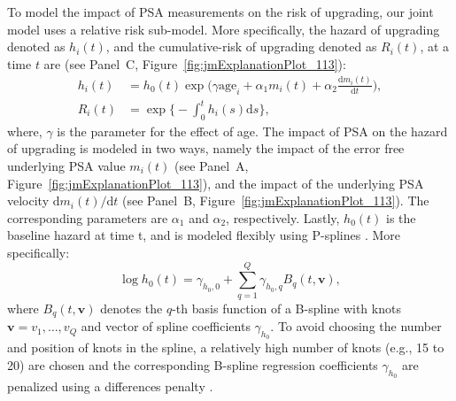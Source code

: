To model the impact of PSA measurements on the risk of upgrading, our joint model uses a relative risk sub-model. More specifically, the hazard of upgrading denoted as $h_i(t)$, and the cumulative-risk of upgrading denoted as $R_i(t)$, at a time $t$ are (see Panel~C, Figure~\ref{fig:jmExplanationPlot_113}):
\begin{equation}
\label{eq:rel_risk_model}
\begin{split}
    h_i(t) &= h_0(t) \exp\Big(\gamma \mbox{age}_i +\alpha_{1} m_{i}(t) + \alpha_{2} \frac{\mathrm{d}m_{i}(t)}{\mathrm{d}{t}}\Big),\\
    R_i(t) &= \exp\Big\{-\int_0^{t} h_i(s)\mathrm{d}{s}\Big\},
    \end{split}
\end{equation}
where, $\gamma$ is the parameter for the effect of age. The impact of PSA on the hazard of upgrading is modeled in two ways, namely the impact of the error free underlying PSA value $m_{i}(t)$ (see Panel~A, Figure~\ref{fig:jmExplanationPlot_113}), and the impact of the underlying PSA velocity $\mathrm{d}m_{i}(t)/\mathrm{d}{t}$ (see Panel~B, Figure~\ref{fig:jmExplanationPlot_113}). The corresponding parameters are $\alpha_{1}$ and $\alpha_{2}$, respectively. Lastly, $h_0(t)$ is the baseline hazard at time t, and is modeled flexibly using P-splines \citep{eilers1996flexible}. More specifically:
\begin{equation*}
\log{h_0(t)} = \gamma_{h_0,0} + \sum_{q=1}^Q \gamma_{h_0,q} B_q(t, \boldsymbol{v}),
\end{equation*}
where $B_q(t, \boldsymbol{v})$ denotes the $q$-th basis function of a B-spline with knots $\boldsymbol{v} = v_1, \ldots, v_Q$ and vector of spline coefficients $\gamma_{h_0}$. To avoid choosing the number and position of knots in the spline, a relatively high number of knots (e.g., 15 to 20) are chosen and the corresponding B-spline regression coefficients $\gamma_{h_0}$ are penalized using a differences penalty \citep{eilers1996flexible}.


